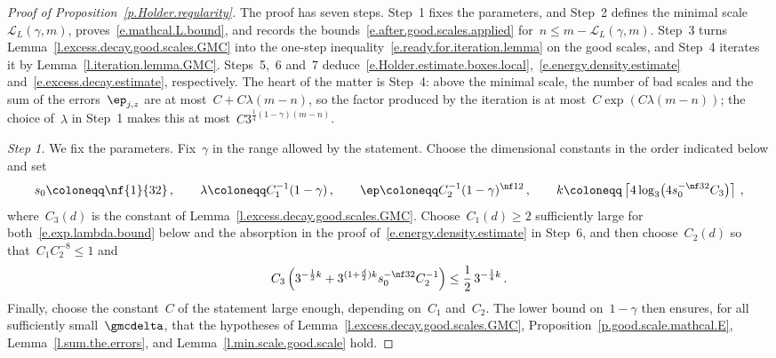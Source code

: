 \documentclass[11pt]{amsart}
\begin{document}
\begin{proof}[{Proof of Proposition~\ref{p.Holder.regularity}}]
The proof has seven steps. Step~1 fixes the parameters, and Step~2 defines the minimal scale~$\mathcal L_L(\gamma,m)$, proves~\eqref{e.mathcal.L.bound}, and records the bounds~\eqref{e.after.good.scales.applied} for~$n\leq m-\mathcal L_L(\gamma,m)$. Step~3 turns Lemma~\ref{l.excess.decay.good.scales.GMC} into the one-step inequality~\eqref{e.ready.for.iteration.lemma} on the good scales, and Step~4 iterates it by Lemma~\ref{l.iteration.lemma.GMC}. Steps~5,~6 and~7 deduce~\eqref{e.Holder.estimate.boxes.local},~\eqref{e.energy.density.estimate} and~\eqref{e.excess.decay.estimate}, respectively. The heart of the matter is Step~4: above the minimal scale, the number of bad scales and the sum of the errors~$\ep_{j,z}$ are at most~$C+C\lambda(m-n)$, so the factor produced by the iteration is at most~$C\exp(C\lambda(m-n))$; the choice of~$\lambda$ in Step~1 makes this at most~$C3^{\frac{1}{4}(1-\gamma)(m-n)}$.

\smallskip

\emph{Step 1.} We fix the parameters. Fix~$\gamma$ in the range allowed by the statement. Choose the dimensional constants in the order indicated below and set
\begin{equation}
	s_0\coloneqq \nf{1}{32}\,,
	\qquad
	\lambda\coloneqq C_1^{-1}(1-\gamma)\,,
	\qquad
	\ep\coloneqq C_2^{-1}(1-\gamma)^{\nf12}\,,
	\qquad
	k\coloneqq\left\lceil4\log_3\!\left(4s_0^{-\nf32}C_3\right)\right\rceil\,,
	\label{e.choices.hepk.Holder.proof}
\end{equation}
where~$C_3(d)$ is the constant of Lemma~\ref{l.excess.decay.good.scales.GMC}. Choose~$C_1(d)\geq2$ sufficiently large for both~\eqref{e.exp.lambda.bound} below and the absorption in the proof of~\eqref{e.energy.density.estimate} in Step~6, and then choose~$C_2(d)$ so that~$C_1C_2^{-8}\leq1$ and
\begin{equation*}
	C_3
	\left(3^{-\frac{1}{2}k}+3^{(1+\frac{d}{2})k}s_0^{-\nf32}C_2^{-1}\right)
	\leq\frac12\,3^{-\frac{1}{4}k}\,.
\end{equation*}
Finally, choose the constant~$C$ of the statement large enough, depending on~$C_1$ and~$C_2$. The lower bound on~$1-\gamma$ then ensures, for all sufficiently small~$\gmcdelta$, that the hypotheses of Lemma~\ref{l.excess.decay.good.scales.GMC}, Proposition~\ref{p.good.scale.mathcal.E}, Lemma~\ref{l.sum.the.errors}, and Lemma~\ref{l.min.scale.good.scale} hold.

\smallskip


\end{proof}
\end{document}
